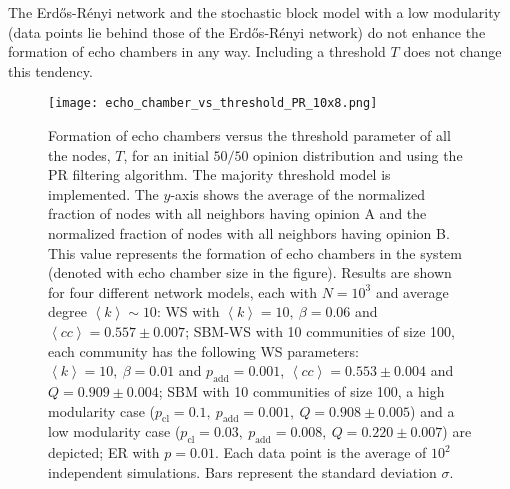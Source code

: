 \documentclass[11 pt , letterpaper , twoside , openright]{book}
\begin{document}
\newline
The Erd\H{o}s-R\'{e}nyi network and the stochastic block model with a low modularity (data points lie behind those of the Erd\H{o}s-R\'{e}nyi network) do not enhance the formation of echo chambers in any way. Including a threshold $T$ does not change this tendency. %
\begin{figure}[H]
	\texttt{[image: echo\_chamber\_vs\_threshold\_PR\_10x8.png]}
	\captionsetup{format=plain}
	\caption[Formation of echo chambers versus the threshold parameter of all the nodes, $T$, for the PR filtering algorithm and an initial $50/50$ opinion distribution. The majority threshold model is implemented.]{Formation of echo chambers versus the threshold parameter of all the nodes, $T$, for an initial $50/50$ opinion distribution and using the PR filtering algorithm. The majority threshold model is implemented. The $y$-axis shows the average of the normalized fraction of nodes with all neighbors having opinion A and the normalized fraction of nodes with all neighbors having opinion B. This value represents the formation of echo chambers in the system (denoted with echo chamber size in the figure). Results are shown for four different network models, each with $N=10^3$ and average degree $\left<k\right> \sim 10$: WS with $\left<k\right> =10,\ \beta = 0.06$ and $\left<cc\right> = 0.557 \pm 0.007$; SBM-WS with 10 communities of size 100, each community has the following WS parameters: $\left<k\right> = 10,\ \beta = 0.01$ and $p_{\text{add}} = 0.001$, $\left<cc\right> = 0.553 \pm 0.004$ and $Q = 0.909 \pm 0.004$; SBM with 10 communities of size 100, a high modularity case ($p_{\text{cl}} = 0.1,\ p_{\text{add}} = 0.001,\ Q = 0.908 \pm 0.005$) and a low modularity case ($p_{\text{cl}} = 0.03,\ p_{\text{add}} = 0.008,\ Q = 0.220 \pm 0.007$) are depicted; ER with $p= 0.01$. Each data point is the average of $10^2$ independent simulations. Bars represent the standard deviation $\sigma$.}
\label{echo_vs_threshold_PR}
\end{figure}
\noindent
\end{document}
